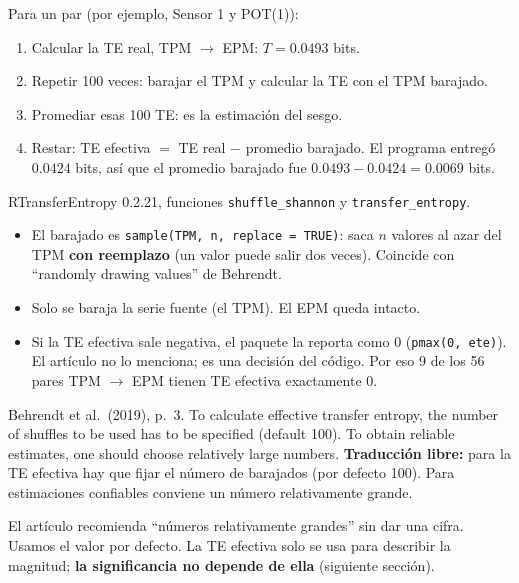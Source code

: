 \documentclass[11pt,openany]{book}
\begin{document}
Para un par (por ejemplo, Sensor 1 y POT(1)):
\begin{enumerate}
\item Calcular la TE real, TPM $\to$ EPM: $T = 0.0493$ bits.
\item Repetir 100 veces: barajar el TPM y calcular la TE con el TPM barajado.
\item Promediar esas 100 TE: es la estimación del sesgo.
\item Restar: TE efectiva $=$ TE real $-$ promedio barajado. El programa entregó $0.0424$ bits, así que el promedio barajado fue $0.0493 - 0.0424 = 0.0069$ bits.
\end{enumerate}

\begin{codigo}{RTransferEntropy 0.2.21, funciones \texttt{shuffle\_shannon} y \texttt{transfer\_entropy}.}
\begin{itemize}
\item El barajado es \texttt{sample(TPM, n, replace = TRUE)}: saca $n$ valores al azar del TPM \textbf{con reemplazo} (un valor puede salir dos veces). Coincide con ``randomly drawing values'' de Behrendt.
\item Solo se baraja la serie fuente (el TPM). El EPM queda intacto.
\item Si la TE efectiva sale negativa, el paquete la reporta como 0 (\texttt{pmax(0, ete)}). El artículo no lo menciona; es una decisión del código. Por eso 9 de los 56 pares TPM $\to$ EPM tienen TE efectiva exactamente 0.
\end{itemize}
\end{codigo}

\begin{cita}{Behrendt et al.\ (2019), p.~3.}
To calculate effective transfer entropy, the number of shuffles to be used has to be specified (default 100). To obtain reliable estimates, one should choose relatively large numbers.
\tcblower
\textbf{Traducción libre:} para la TE efectiva hay que fijar el número de barajados (por defecto 100). Para estimaciones confiables conviene un número relativamente grande.
\end{cita}

\begin{ojo}
El artículo recomienda ``números relativamente grandes'' sin dar una cifra. Usamos el valor por defecto. La TE efectiva solo se usa para describir la magnitud; \textbf{la significancia no depende de ella} (siguiente sección).
\end{ojo}
\end{document}
